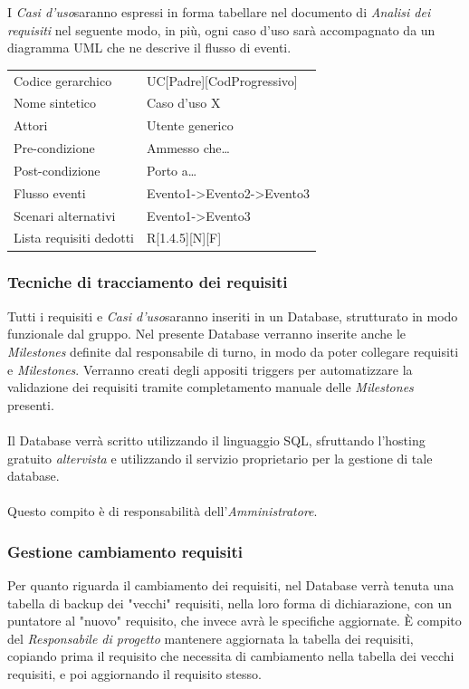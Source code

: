 \documentclass[a4paper]{article}
\newcommand{\UC}{\emph{Casi d'uso}\space}
\begin{document}
			 I \UC saranno espressi in forma tabellare nel documento di \emph{Analisi dei requisiti}
			 nel seguente modo, in più, ogni caso d'uso sarà accompagnato da un diagramma UML che ne
			 descrive il flusso di eventi.
			 \begin{table}[H]
				\begin{tabularx}{\textwidth}{X | X}\toprule
					\rowcolor{orange!65}Codice gerarchico & UC[Padre][CodProgressivo] \\
					Nome sintetico & Caso d'uso X \\
					\rowcolor{orange!65}Attori & Utente generico\\
					Pre-condizione & Ammesso che\dots \\
					\rowcolor{orange!65}Post-condizione & Porto a\dots \\
					Flusso eventi & Evento1->Evento2->Evento3\\
					\rowcolor{orange!65}Scenari alternativi & Evento1->Evento3\\
					Lista requisiti dedotti & R[1.4.5][N][F]\\
					\bottomrule
				\end{tabularx}
			 \end{table}

		\subsubsection{Tecniche di tracciamento dei requisiti}
			Tutti i requisiti e \UC saranno inseriti in un Database, strutturato in modo funzionale
			 dal gruppo. Nel presente Database verranno inserite anche le \emph{Milestones} definite
			 dal responsabile di turno, in modo da poter collegare requisiti e \emph{Milestones}. Verranno
			 creati degli appositi triggers per automatizzare la validazione dei requisiti tramite
			  completamento manuale delle \emph{Milestones} presenti.
			\\ \\
			Il Database verrà scritto utilizzando il linguaggio SQL, sfruttando l'hosting gratuito
			\emph{altervista} e utilizzando il servizio proprietario per la gestione di tale database.
			\\ \\
			Questo compito è di responsabilità dell'\emph{Amministratore}.
		\subsubsection{Gestione cambiamento requisiti}
		Per quanto riguarda il cambiamento dei requisiti, nel Database verrà tenuta una tabella di backup dei "vecchi" requisiti,
		nella loro forma di dichiarazione, con un puntatore al "nuovo" requisito, che invece avrà le specifiche aggiornate. È compito del
		\emph{Responsabile di progetto} mantenere aggiornata la tabella dei requisiti, copiando prima il requisito che necessita di cambiamento
		nella tabella dei vecchi requisiti, e poi aggiornando il requisito stesso.
\end{document}
